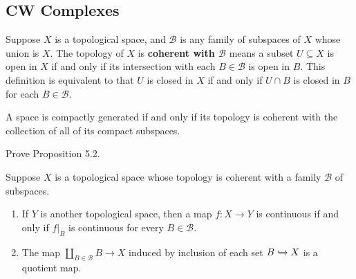 \subsection{CW Complexes}

Suppose $X$ is a topological space, and $\mathscr{B}$ is any family of subspaces of $X$ whose union is $X$. The topology of $X$ is \textbf{coherent with $\mathscr{B}$} means a subset $U \subseteq X$ is open in $X$ if and only if its intersection with each $B\in\mathscr{B}$ is open in $B$. This definition is equivalent to that $U$ is closed in $X$ if and only if $U\cap B$ is closed in $B$ for each $B \in \mathscr{B}$.

A space is compactly generated if and only if its topology is coherent with the collection of all of its compact subspaces.

\begin{exercise}{5.3}
	Prove Proposition 5.2.

	Suppose $X$ is a topological space whose topology is coherent with a family $\mathscr{B}$ of subspaces.
	\begin{enumerate}[label={(\alph*)}]
		\item If $Y$ is another topological space, then a map $f: X\to Y$ is continuous if and only if $f\vert_{B}$ is continuous for every $B\in \mathscr{B}$.
		\item The map $\coprod_{B\in\mathscr{B}}B \to X$ induced by inclusion of each set $B\xhookrightarrow{} X$ is a quotient map.
	\end{enumerate}
\end{exercise}

